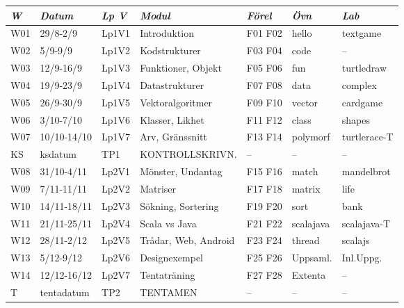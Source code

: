 \begin{tabular}{l|l|l|l|l|l|l}
\textit{W} & \textit{Datum} & \textit{Lp V} & \textit{Modul} & \textit{Förel} & \textit{Övn} & \textit{Lab} \\ \hline \hline
W01 & 29/8-2/9    & Lp1V1 & Introduktion         & F01 F02 & hello     & textgame     \\
W02 & 5/9-9/9     & Lp1V2 & Kodstrukturer        & F03 F04 & code      & --           \\
W03 & 12/9-16/9   & Lp1V3 & Funktioner, Objekt   & F05 F06 & fun       & turtledraw   \\
W04 & 19/9-23/9   & Lp1V4 & Datastrukturer       & F07 F08 & data      & complex      \\
W05 & 26/9-30/9   & Lp1V5 & Vektoralgoritmer     & F09 F10 & vector    & cardgame     \\
W06 & 3/10-7/10   & Lp1V6 & Klasser, Likhet      & F11 F12 & class     & shapes       \\
W07 & 10/10-14/10 & Lp1V7 & Arv, Gränssnitt      & F13 F14 & polymorf  & turtlerace-T \\
KS  & ksdatum     & TP1   & KONTROLLSKRIVN.      & --      & --        & --           \\
W08 & 31/10-4/11  & Lp2V1 & Mönster, Undantag    & F15 F16 & match     & mandelbrot   \\
W09 & 7/11-11/11  & Lp2V2 & Matriser             & F17 F18 & matrix    & life         \\
W10 & 14/11-18/11 & Lp2V3 & Sökning, Sortering   & F19 F20 & sort      & bank         \\
W11 & 21/11-25/11 & Lp2V4 & Scala vs Java        & F21 F22 & scalajava & scalajava-T  \\
W12 & 28/11-2/12  & Lp2V5 & Trådar, Web, Android & F23 F24 & thread    & scalajs      \\
W13 & 5/12-9/12   & Lp2V6 & Designexempel        & F25 F26 & Uppsaml.  & Inl.Uppg.    \\
W14 & 12/12-16/12 & Lp2V7 & Tentaträning         & F27 F28 & Extenta   & --           \\
T   & tentadatum  & TP2   & TENTAMEN             & --      & --        & --           \\
\end{tabular}
